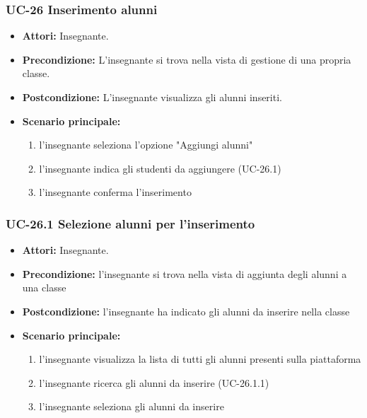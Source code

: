 \subsubsection{UC-26 Inserimento alunni}
\begin{itemize}
	\item \textbf{Attori:} Insegnante.
	\item \textbf{Precondizione:} L'insegnante si trova nella vista di gestione di una propria classe.
	\item \textbf{Postcondizione:} L'insegnante visualizza gli alunni inseriti.
	\item \textbf{Scenario principale:}
	\begin{enumerate}
		\item l'insegnante seleziona l'opzione "Aggiungi alunni"
		\item l'insegnante indica gli studenti da aggiungere (UC-26.1)
		\item l'insegnante conferma l'inserimento
	\end{enumerate}
\end{itemize}

\subsubsection{UC-26.1 Selezione alunni per l'inserimento}
\begin{itemize}
	\item \textbf{Attori:} Insegnante.
	\item \textbf{Precondizione:} l'insegnante si trova nella vista di aggiunta degli alunni a una classe
	\item \textbf{Postcondizione:} l'insegnante ha indicato gli alunni da inserire nella classe
	\item \textbf{Scenario principale:}
	\begin{enumerate}
		\item l'insegnante visualizza la lista di tutti gli alunni presenti sulla piattaforma
		\item l'insegnante ricerca gli alunni da inserire (UC-26.1.1)	
		\item l'insegnante seleziona gli alunni da inserire
	\end{enumerate}
\end{itemize}

